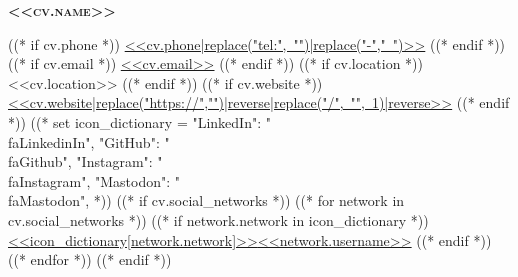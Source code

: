 \begin{center}
    \textbf{\fontsize{<<design.header_font_size>>}{<<design.header_font_size>>}\scshape <<cv.name>>} \\ \vspace{3pt}
    \small

    ((* if cv.phone *))
    \mbox{\href{<<cv.phone|replace("-","")>>}{{\footnotesize\faPhone*}\hspace{4pt}<<cv.phone|replace("tel:", "")|replace("-"," ")>>}}
    \hspace{<<design.space_between_connection_objects>>}
    ((* endif *))
    ((* if cv.email *))
    \mbox{\href{mailto:<<cv.email>>}{{\small\faEnvelope[regular]}\hspace{4pt}<<cv.email>>}}
    \hspace{<<design.space_between_connection_objects>>}
    ((* endif *))
    ((* if cv.location *))
    \mbox{{\small\faMapMarker*}\hspace{4pt}<<cv.location>>}
    \hspace{<<design.space_between_connection_objects>>}
    ((* endif *))
    ((* if cv.website *))
    \mbox{\href{<<cv.website>>}{{\small\faLink}\hspace{4pt}<<cv.website|replace("https://","")|reverse|replace("/", "", 1)|reverse>>}}
    \hspace{<<design.space_between_connection_objects>>}
    ((* endif *))
    ((*
        set icon_dictionary = {
            "LinkedIn": "\\faLinkedinIn",
            "GitHub": "\\faGithub",
            "Instagram": "\\faInstagram",
            "Mastodon": "\\faMastodon",
        }
    *))
    ((* if cv.social_networks *))
        ((* for network in cv.social_networks *))
            ((* if network.network in icon_dictionary *))
    \mbox{\href{<<network.url>>}{{\small<<icon_dictionary[network.network]>>}\hspace{4pt}<<network.username>>}}
    \hspace{<<design.space_between_connection_objects>>}
            ((* endif *))
        ((* endfor *))
    ((* endif *))
\end{center}

\let\hrefWithoutArrow\href
\renewcommand{\href}[2]{\hrefWithoutArrow{#1}{\color{<<design.link_color>>}\mbox{#2 \raisebox{.15ex}{\footnotesize \faExternalLink*}}}}